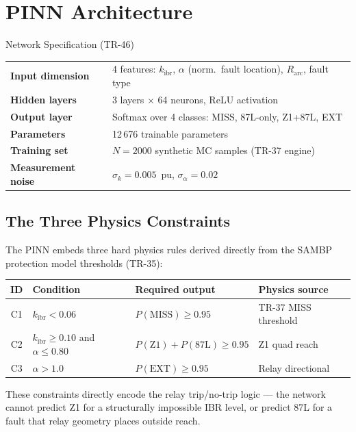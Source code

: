 \documentclass[12pt,a4paper]{article}
\newcommand{\kibr}{k_\mathrm{ibr}}
\begin{document}
\section{PINN Architecture}

\begin{archbox}{Network Specification (TR-46)}
\begin{tabular}{@{}ll@{}}
\textbf{Input dimension}  & 4 features: $\kibr$, $\alpha$ (norm.\ fault location), $R_\mathrm{arc}$, fault type \\
\textbf{Hidden layers}    & 3 layers $\times$ 64 neurons, ReLU activation \\
\textbf{Output layer}     & Softmax over 4 classes: MISS, 87L-only, Z1+87L, EXT \\
\textbf{Parameters}       & 12\,676 trainable parameters \\
\textbf{Training set}     & $N = 2000$ synthetic MC samples (TR-37 engine) \\
\textbf{Measurement noise} & $\sigma_k = 0.005$~pu, $\sigma_\alpha = 0.02$ \\
\end{tabular}
\end{archbox}

\subsection{The Three Physics Constraints}

The PINN embeds three hard physics rules derived directly from the SAMBP protection model thresholds (TR-35):

\begin{center}
\begin{tabular}{@{}clll@{}}
\toprule
\textbf{ID} & \textbf{Condition} & \textbf{Required output} & \textbf{Physics source} \\
\midrule
C1 & $\kibr < 0.06$                            & $P(\text{MISS}) \geq 0.95$ & TR-37 MISS threshold \\
C2 & $\kibr \geq 0.10$ and $\alpha \leq 0.80$ & $P(\text{Z1})+P(\text{87L}) \geq 0.95$ & Z1 quad reach \\
C3 & $\alpha > 1.0$                            & $P(\text{EXT}) \geq 0.95$ & Relay directional \\
\bottomrule
\end{tabular}
\end{center}

These constraints directly encode the relay trip/no-trip logic — the network cannot predict Z1 for a structurally impossible IBR level, or predict 87L for a fault that relay geometry places outside reach.
\end{document}
